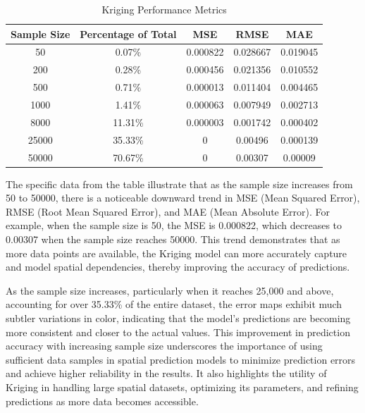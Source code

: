 \documentclass{swmcmthesis}
\begin{document}
\begin{table}[h!]
\centering
\caption{Kriging Performance Metrics}
\label{tab:sample_size_metrics}
\begin{tabular}{|c|c|c|c|c|}
\hline
\textbf{Sample Size} & \textbf{Percentage of Total} & \textbf{MSE} & \textbf{RMSE} & \textbf{MAE} \\ \hline
50     & 0.07\%  & 0.000822 & 0.028667 & 0.019045 \\ \hline
200    & 0.28\%  & 0.000456 & 0.021356 & 0.010552 \\ \hline
500    & 0.71\%  & 0.000013 & 0.011404 & 0.004465 \\ \hline
1000   & 1.41\%  & 0.000063 & 0.007949 & 0.002713 \\ \hline
8000   & 11.31\% & 0.000003 & 0.001742 & 0.000402 \\ \hline
25000  & 35.33\% & 0 & 0.00496  & 0.000139 \\ \hline
50000  & 70.67\% & 0 & 0.00307  & 0.00009  \\ \hline
\end{tabular}
\end{table}

The specific data from the table illustrate that as the sample size increases from 50 to 50000, there is a noticeable downward trend in MSE (Mean Squared Error), RMSE (Root Mean Squared Error), and MAE (Mean Absolute Error). For example, when the sample size is 50, the MSE is 0.000822, which decreases to 0.00307 when the sample size reaches 50000. This trend demonstrates that as more data points are available, the Kriging model can more accurately capture and model spatial dependencies, thereby improving the accuracy of predictions.

As the sample size increases, particularly when it reaches 25,000 and above, accounting for over 35.33\% of the entire dataset, the error maps exhibit much subtler variations in color, indicating that the model’s predictions are becoming more consistent and closer to the actual values. This improvement in prediction accuracy with increasing sample size underscores the importance of using sufficient data samples in spatial prediction models to minimize prediction errors and achieve higher reliability in the results. It also highlights the utility of Kriging in handling large spatial datasets, optimizing its parameters, and refining predictions as more data becomes accessible.
\end{document}
